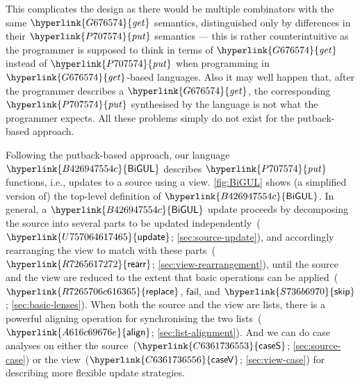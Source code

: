 \documentclass[fleqn]{llncs}
\newcommand{\identifier}[1]{\mathit{#1}}
\newcommand{\constructor}[1]{\mathsf{#1}}
\begin{document}
This complicates the design as there would be multiple combinators with the same \ensuremath{\protect\hyperlink{G676574}{\identifier{get}}} semantics, distinguished only by differences in their \ensuremath{\protect\hyperlink{P707574}{\identifier{put}}} semantics --- this is rather counterintuitive as the programmer is supposed to think in terms of \ensuremath{\protect\hyperlink{G676574}{\identifier{get}}} instead of \ensuremath{\protect\hyperlink{P707574}{\identifier{put}}} when programming in \ensuremath{\protect\hyperlink{G676574}{\identifier{get}}}-based languages.
Also it may well happen that, after the programmer describes a \ensuremath{\protect\hyperlink{G676574}{\identifier{get}}}, the corresponding \ensuremath{\protect\hyperlink{P707574}{\identifier{put}}} synthesised by the language is not what the programmer expects.
All these problems simply do not exist for the putback-based approach.

Following the putback-based approach, our language \ensuremath{\protect\hyperlink{B426947554c}{\constructor{BiGUL}}} describes \ensuremath{\protect\hyperlink{P707574}{\identifier{put}}} functions, i.e., updates to a source using a view.
\autoref{fig:BiGUL} shows (a simplified version of) the top-level definition of \ensuremath{\protect\hyperlink{B426947554c}{\constructor{BiGUL}}}.
In general, a \ensuremath{\protect\hyperlink{B426947554c}{\constructor{BiGUL}}} update proceeds by decomposing the source into several parts to be updated independently~(\ensuremath{\protect\hyperlink{U757064617465}{\constructor{update}}}; \autoref{sec:source-update}), and accordingly rearranging the view to match with these parts~(\ensuremath{\protect\hyperlink{R7265617272}{\constructor{rearr}}}; \autoref{sec:view-rearrangement}), until the source and the view are reduced to the extent that basic operations can be applied~(\ensuremath{\protect\hyperlink{R7265706c616365}{\constructor{replace}}}, \ensuremath{\constructor{fail}}, and \ensuremath{\protect\hyperlink{S736b6970}{\constructor{skip}}}; \autoref{sec:basic-lenses}).
When both the source and the view are lists, there is a powerful aligning operation for synchronising the two lists~(\ensuremath{\protect\hyperlink{A616c69676e}{\constructor{align}}}; \autoref{sec:list-alignment}).
And we can do case analyses on either the source~(\ensuremath{\protect\hyperlink{C6361736553}{\constructor{caseS}}}; \autoref{sec:source-case}) or the view~(\ensuremath{\protect\hyperlink{C6361736556}{\constructor{caseV}}}; \autoref{sec:view-case}) for describing more flexible update strategies.
\end{document}
